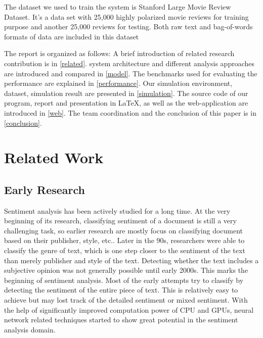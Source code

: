 \documentclass[conference]{IEEEtran}
\begin{document}
    The dataset we used to train the system is Stanford Large Movie Review 
    Dataset\cite{maas2011learning}. It's a data set with 25,000 highly polarized
    movie reviews for training purpose and another 25,000 reviews for testing.
    Both raw text and bag-of-words formats of data are included in this dataset
    
    The report is organized as follows: 
    A brief introduction of related research contribution is in \autoref{related}.
    system architecture and different analysis approaches are introduced and compared 
    in \autoref{model}.
    The benchmarks used for evaluating the performance are explained in 
    \autoref{performance}.
    Our simulation environment, dataset, simulation result are presented in 
    \autoref{simulation}. The source code of our program, report and 
    presentation in \LaTeX, as well as the web-application are introduced in \autoref{web}.
    The team coordination and the conclusion of this paper is in \autoref{conclusion}.
    
\section{Related Work}
\label{related}
\subsection{Early Research}
    Sentiment analysis has been actively studied for a long time. At the very beginning
    of its research, classifying sentiment of a document is still a very challenging
    task, so earlier research are mostly focus on classifying document based on their 
    publisher, style, etc.\cite{biber1991variation}. Later in the 90s, researchers 
    were able to classify the genre 
    of text\cite{karlgren1994recognizing,kessler1997automatic}, 
    which is one step closer to the sentiment of the text
    than merely publisher and style of the text. Detecting whether
    the text includes a subjective opinion was not generally possible until early 
    2000s\cite{hatzivassiloglou2000effects}. This marks the beginning of 
    sentiment analysis. Most of the early attempts try to  classify by detecting 
    the sentiment of the entire piece of text\cite{pang2002thumbs,pang2005seeing}. 
    This is relatively easy to achieve but may lost track of the detailed sentiment
    or mixed sentiment\cite{lu2011multi}.
    With the help of significantly improved
    computation power of CPU and GPUs, neural network related techniques 
    started to show great potential in the sentiment analysis 
    domain\cite{kim2014convolutional,barnes2017assessing}.
\end{document}
